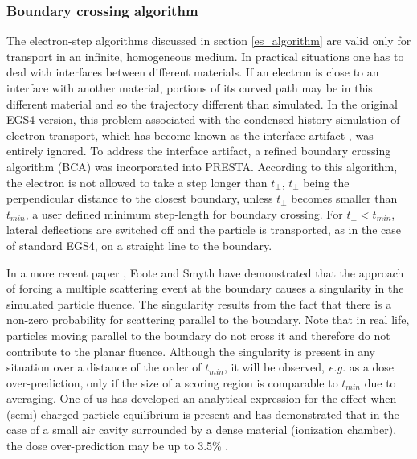 \subsubsection{Boundary crossing algorithm}
\label{BCA}
\setcounter{equation}{0}

The electron-step algorithms discussed in section
\ref{es_algorithm} are valid only for transport in
an infinite, homogeneous medium. In practical
situations one has to deal with interfaces between
different materials. If an electron is close
to an interface with another material, portions
of its curved path may be in this different material and
so the trajectory different than simulated.
In the original EGS4 version, this problem associated
with the condensed history simulation of electron
transport, which has become known as the interface artifact \cite{Bi85}, was
entirely ignored.
To address the interface artifact,
a refined boundary crossing algorithm (BCA) was
incorporated into PRESTA. According to this algorithm, the electron
is not allowed to take a step longer than $t_\perp$, $t_\perp$ being
the perpendicular distance to the closest boundary, unless
$t_\perp$ becomes smaller than $t_{min}$, a user defined
minimum step-length for boundary crossing. For $t_\perp < t_{min}$,
lateral deflections are switched off and the particle is transported,
as in the case of standard EGS4, on a straight line to the
boundary.

In a more recent paper \cite{FS95}, Foote and Smyth have demonstrated
that the approach of forcing a multiple scattering event at the
boundary causes a singularity in the simulated particle fluence.
The singularity results from the fact that there is a
non-zero probability for scattering parallel to the boundary.
Note that in real life, particles moving parallel to the boundary do
not cross it and therefore do not contribute to the planar fluence.
Although the singularity is present in any situation over a distance of the
order of $t_{min}$, it will be observed, {\em e.g.} as a dose
over-prediction, only if the
size of a scoring region is comparable to $t_{min}$ due to averaging.
One of us has developed an analytical expression for
the effect when (semi)-charged particle equilibrium is
present and has demonstrated that in the case of a small air
cavity surrounded by a dense material (ionization chamber),
the dose over-prediction may be up to 3.5\% \cite{Ka99b}.

